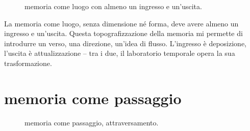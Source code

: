 \begin{figure}[htbp]
\begin{center}
\caption{memoria come luogo con almeno un ingresso e un'uscita.}
\label{slide3}
\end{center}
\end{figure}

La memoria come luogo, senza dimensione né forma, deve avere almeno un ingresso e un'uscita. Questa topografizzazione della memoria mi permette di introdurre un verso, una direzione, un'idea di flusso. L'ingresso è deposizione, l'uscita è attualizzazione – tra i due, il laboratorio temporale opera la sua trasformazione.

\section{memoria come passaggio}

\begin{figure}[htbp]
\begin{center}
\caption{memoria come passaggio, attraversamento.}
\label{slide4}
\end{center}
\end{figure}

